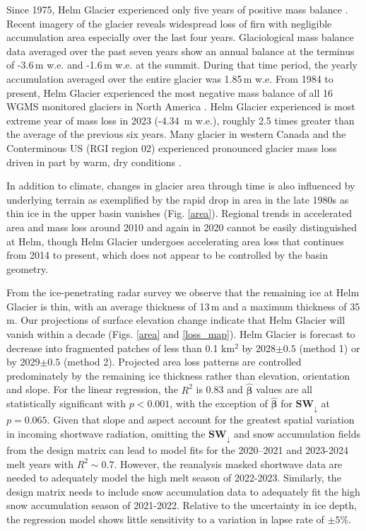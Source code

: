 \documentclass[annals,review,oneside]{igs}
\begin{document}
Since 1975, Helm Glacier experienced only five years of positive mass balance \citep{WGMS2024}. Recent imagery of the glacier reveals widespread loss of firn with negligible accumulation area especially over the last four years. Glaciological mass balance data averaged over the past seven years show an annual balance at the terminus of -3.6\,m w.e. and -1.6\,m w.e. at the summit. During that time period, the yearly accumulation averaged over the entire glacier was 1.85\,m w.e. From 1984 to present, Helm Glacier experienced the most negative mass balance of all 16 WGMS monitored glaciers in North America \citep{WGMS2024}. Helm Glacier experienced is most extreme year of mass loss in 2023 (-4.34\, m w.e.), roughly 2.5 times greater than the average of the previous six years. Many glacier in western Canada and the Conterminous US (RGI region 02) experienced pronounced glacier mass loss driven in part by warm, dry conditions \citep{Menounos2025}. 

In addition to climate, changes in glacier area through time is also influenced by underlying terrain as exemplified by the rapid drop in area in the late 1980s as thin ice in the upper basin vanishes (Fig. \ref{area}). Regional trends in accelerated area and mass loss around 2010 \citep{Bevington2022,Menounos2019} and again in 2020 \citep{Menounos2025} cannot be easily distinguished at Helm, though Helm Glacier undergoes accelerating area loss that continues from 2014 to present, which does not appear to be controlled by the basin geometry. 

From the ice-penetrating radar survey we observe that the remaining ice at Helm Glacier is thin, with an average thickness of 13\,m and a maximum thickness of 35\,m. Our projections of surface elevation change indicate that Helm Glacier will vanish within a decade (Figs. \ref{area} and \ref{loss_map}). Helm Glacier is forecast to decrease into fragmented patches of less than 0.1 km$^2$ by 2028$\pm0.5$ (method 1) or by 2029$\pm0.5$ (method 2). Projected area loss patterns are controlled predominately by the remaining ice thickness rather than elevation, orientation and slope. For the linear regression, the $R^2$ is 0.83 and $\hat{\boldsymbol{\beta}}$ values are all statistically significant with $p<0.001$, with the exception of $\hat{\boldsymbol{\beta}}$ for $\mathbf{SW_{\downarrow}}$ at $p=0.065$. Given that slope and aspect account for the greatest spatial variation in incoming shortwave radiation, omitting the $\mathbf{SW_{\downarrow}}$ and snow accumulation fields from the design matrix can lead to model fits for the  2020--2021 and 2023-2024 melt years with $R^2\sim0.7$. However, the reanalysis masked shortwave data are needed to adequately model the high melt season of 2022-2023. Similarly, the design matrix needs to include snow accumulation data to adequately fit the high snow accumulation season of 2021-2022. Relative to the uncertainty in ice depth, the regression model shows little sensitivity to a variation in lapse rate of $\pm 5\%$.
\end{document}
